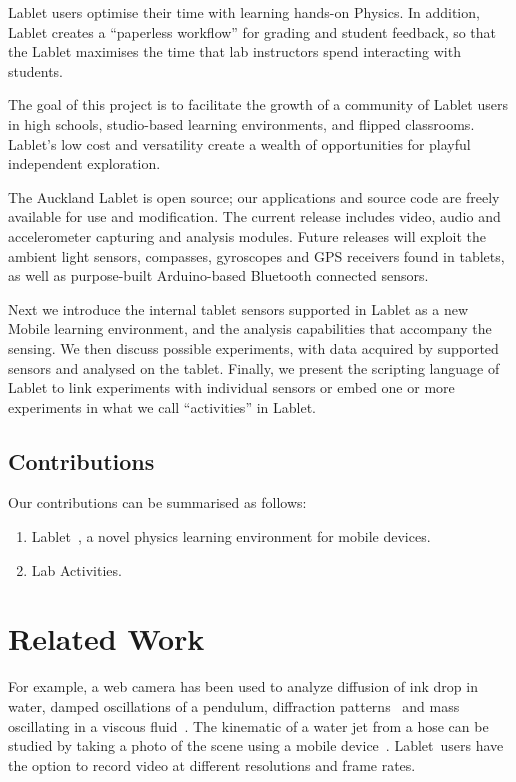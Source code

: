 \documentclass{sigchi}
\newcommand{\lablet}{Lablet\ }
\begin{document}
Lablet users optimise their time with learning hands-on Physics.  In
addition, Lablet creates a “paperless workflow” for grading and
student feedback, so that the Lablet maximises the time that lab
instructors spend interacting with students.

The goal of this project is to facilitate the growth of a community of
Lablet users in high schools, studio-based learning
environments, and flipped classrooms.  Lablet’s low cost and
versatility create a wealth of opportunities for playful independent
exploration.  

The Auckland Lablet is open source; our applications and source code
are freely available for use and modification.  The current release
includes video, audio and accelerometer capturing and analysis
modules.  Future releases will exploit the ambient light sensors,
compasses, gyroscopes and GPS receivers found in tablets, as well as
purpose-built Arduino-based Bluetooth connected sensors.

Next we introduce the internal tablet sensors supported in Lablet as a
new Mobile learning environment, and the analysis capabilities that
accompany the sensing. We then discuss possible experiments, with data
acquired by supported sensors and analysed on the tablet. Finally, we
present the scripting language of Lablet to link experiments with
individual sensors or embed one or more experiments in what we call
``activities'' in Lablet.


\subsection{Contributions}
Our contributions can be summarised as follows:

\begin{enumerate}
\item \lablet, a novel physics learning environment for mobile devices.
\item Lab Activities.
\end{enumerate}

\section{Related Work}
For example, a web camera has been used to analyze diffusion of ink drop in water, damped oscillations of a pendulum, diffraction patterns~\cite{Nedev2006} and mass oscillating in a viscous fluid~\cite{Shamim2010}.
The kinematic of a water jet from a hose can be studied by taking a photo of the scene using a mobile device~\cite{Falcao2009}. \lablet users have the option to record video at different resolutions and
frame rates.
\end{document}
